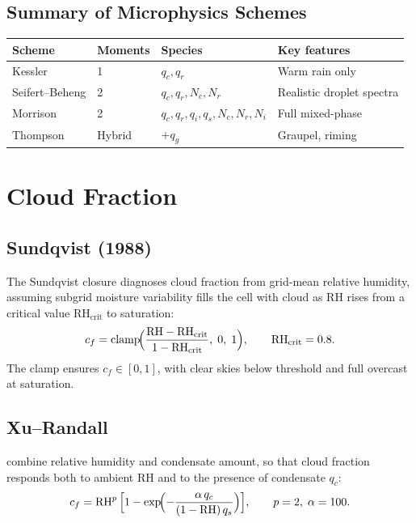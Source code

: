 \documentclass[11pt,twoside]{report}
\begin{document}
\subsection{Summary of Microphysics Schemes}

\begin{center}
\begin{tabular}{lllp{5cm}}
\toprule
Scheme & Moments & Species & Key features \\
\midrule
Kessler & 1 & $q_c,q_r$ & Warm rain only \\
Seifert--Beheng & 2 & $q_c,q_r,N_c,N_r$ & Realistic droplet spectra \\
Morrison & 2 & $q_c,q_r,q_i,q_s,N_c,N_r,N_i$ & Full mixed-phase \\
Thompson & Hybrid & $+q_g$ & Graupel, riming \\
\bottomrule
\end{tabular}
\end{center}


\section{Cloud Fraction}
\label{sec:clouds}

\subsection{Sundqvist (1988)}

The Sundqvist closure \citep{Sundqvist1989} diagnoses cloud fraction from
grid-mean relative humidity, assuming subgrid moisture variability fills the
cell with cloud as RH rises from a critical value $\mathrm{RH}_{\mathrm{crit}}$
to saturation:
\begin{equation}
  c_f = \mathrm{clamp}\!\Bigl(\frac{\mathrm{RH}-\mathrm{RH}_{\mathrm{crit}}}
  {1-\mathrm{RH}_{\mathrm{crit}}},\;0,\;1\Bigr),
  \qquad \mathrm{RH}_{\mathrm{crit}}=0.8.
\end{equation}
The clamp ensures $c_f\in[0,1]$, with clear skies below threshold and full
overcast at saturation.

\subsection{Xu--Randall}

\citet{XuRandall1996} combine relative humidity and condensate amount, so that cloud fraction
responds both to ambient RH and to the presence of condensate $q_c$:
\begin{equation}
  c_f = \mathrm{RH}^p\,\Bigl[1-\exp\!\Bigl(
  -\frac{\alpha\,q_c}{(1-\mathrm{RH})\,q_s}\Bigr)\Bigr],
  \qquad p=2,\;\alpha=100.
\end{equation}
\end{document}
